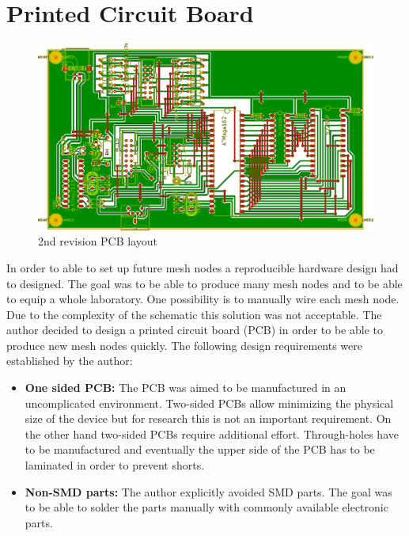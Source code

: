 \section{Printed Circuit Board}%
\begin{figure}[H]
\includegraphics[width=\textwidth]{figures/2nd_rev_pcb_layout.png}
\caption{2nd revision PCB layout}
\end{figure}

In order to able to set up future mesh nodes a reproducible hardware design had to designed. The goal was to be able to produce many mesh nodes and to be able to equip a whole laboratory. One possibility is to manually wire each mesh node. Due to the complexity of the schematic this solution was not acceptable. The author decided to design a printed circuit board (PCB) in order to be able to produce new mesh nodes quickly. The following design requirements were established by the author:

\begin{itemize}
    \item \textbf{One sided PCB: } The PCB was aimed to be manufactured in an uncomplicated environment. Two-sided PCBs allow minimizing the physical size of the device but for research this is not an important requirement. On the other hand two-sided PCBs require additional effort. Through-holes have to be manufactured and eventually the upper side of the PCB has to be laminated in order to prevent shorts.
    \item \textbf{Non-SMD parts: } The author explicitly avoided SMD parts. The goal was to be able to solder the parts manually with commonly available electronic parts.
\end{itemize}

